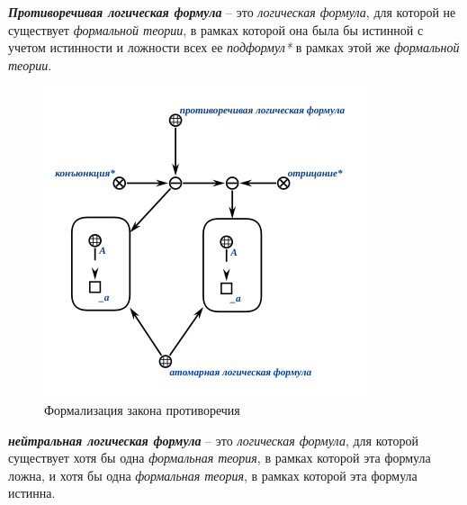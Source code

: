 \begin{SCn}
\end{SCn}
\textbf{\textit{Противоречивая логическая формула}} -- это \textit{логическая формула}, для которой не существует \textit{формальной теории}, в рамках которой она была бы истинной с учетом истинности и ложности всех ее \textit{подформул*} в рамках этой же \textit{формальной теории}.

\begin{figure}[http]
	\includegraphics[scale=0.8]{author/part2/figures/logic/contradiction_formula.png}
	\caption{Формализация закона противоречия}
	\label{fig:contradiction_formula}
\end{figure}

\begin{SCn}
\end{SCn}

\textbf{\textit{нейтральная логическая формула}} -- это \textit{логическая формула}, для которой существует хотя бы одна \textit{формальная теория}, в рамках которой эта формула ложна, и хотя бы одна \textit{формальная теория}, в рамках которой эта формула истинна.

